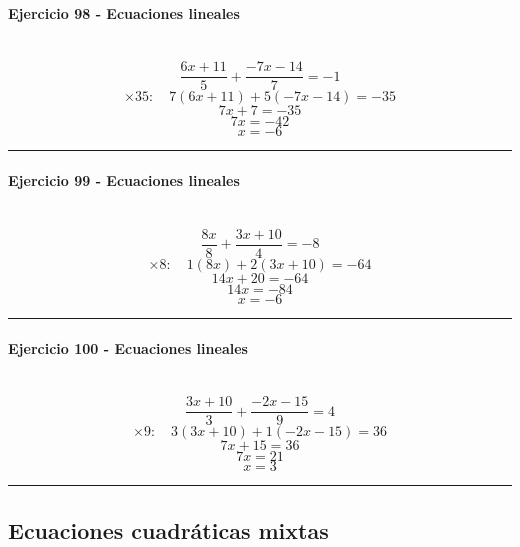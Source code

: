 \documentclass[10pt,a4paper]{article}
\newcommand{\res}[1]{\paragraph{#1}\mbox{}\\[-1.2em]}
\begin{document}
\res{Ejercicio 98 - Ecuaciones lineales}
\[ \frac{6 x + 11}{5}+\frac{- 7 x - 14}{7}=-1 \]
\[ \times 35:\quad 7(6 x + 11)+5(- 7 x - 14)=-35 \]
\[ 7 x + 7=-35 \]
\[ 7x=-42 \]
\[ \boxed{x=-6} \]
\vspace{1mm}\hrule\vspace{2mm}
\res{Ejercicio 99 - Ecuaciones lineales}
\[ \frac{8 x}{8}+\frac{3 x + 10}{4}=-8 \]
\[ \times 8:\quad 1(8 x)+2(3 x + 10)=-64 \]
\[ 14 x + 20=-64 \]
\[ 14x=-84 \]
\[ \boxed{x=-6} \]
\vspace{1mm}\hrule\vspace{2mm}
\res{Ejercicio 100 - Ecuaciones lineales}
\[ \frac{3 x + 10}{3}+\frac{- 2 x - 15}{9}=4 \]
\[ \times 9:\quad 3(3 x + 10)+1(- 2 x - 15)=36 \]
\[ 7 x + 15=36 \]
\[ 7x=21 \]
\[ \boxed{x=3} \]
\vspace{1mm}\hrule\vspace{2mm}
\subsection{Ecuaciones cuadráticas mixtas}
\end{document}
